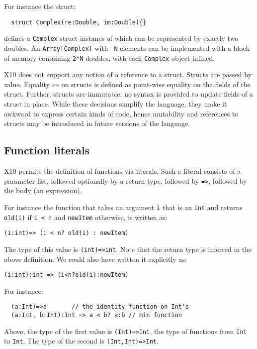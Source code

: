 For instance the struct:
{\footnotesize
\begin{verbatim}
  struct Complex(re:Double, im:Double){}
\end{verbatim}}
\noindent defines a {\tt Complex} struct instanes of which can be
represented by  exactly two doubles. An {\tt Array[Complex]} with {\tt
  N} elements can be implemented with a block of memory containing
{\tt 2*N} doubles, with each {\tt Complex} object inlined. 

X10 does not support any notion of a reference to a struct. 
Structs are passed by value. Equality {\tt ==} on structs is defined as
point-wise equality on the fields of the struct. Further, structs are
immutable, no syntax is provided to update fields of a struct in
place.  While these decisions simplify the language, they make it
awkward to express certain kinds of code, hence mutability and
references to structs may be introduced in future versions of the
language. 

\subsection{Function literals}\label{sec:x10-basic-functions}\label{sec:x10-basics-functions}
X10 permits the definition of functions via literals. 
Such a literal consists of a parameter list, followed optionally by a
return type, followed by {\tt =>}, followed by the body (an
expression).

For instance the function that takes an argument {\tt i} that is an {\tt int} and returns
{\tt old(i)} if {\tt i < n} and {\tt newItem} otherwise, is written as:
{\footnotesize
\begin{verbatim}
(i:int)=> (i < n? old(i) : newItem)
\end{verbatim}}
The type of this value is {\tt (int)=>int}. Note that the return type is inferred in the above definition. We could also have written it explicitly as:
{\footnotesize
\begin{verbatim}
(i:int):int => (i<n?old(i):newItem)
\end{verbatim}}

For instance:
{\footnotesize
\begin{verbatim}
  (a:Int)=>a       // the identity function on Int's
  (a:Int, b:Int):Int => a < b? a:b // min function
\end{verbatim}}
Above, the type of the first value is {\tt (Int)=>Int}, the type of
functions from {\tt Int} to {\tt Int}. The type of the second is
{\tt (Int,Int)=>Int}. 

